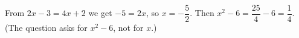 From $2x-3=4x+2$ we get $-5=2x$, so $x=-\dfrac{5}{2}$. Then $x^2-6=\dfrac{25}{4}-6=\boxed{\dfrac{1}{4}}$. (The question asks for $x^2-6$, not for $x$.)
